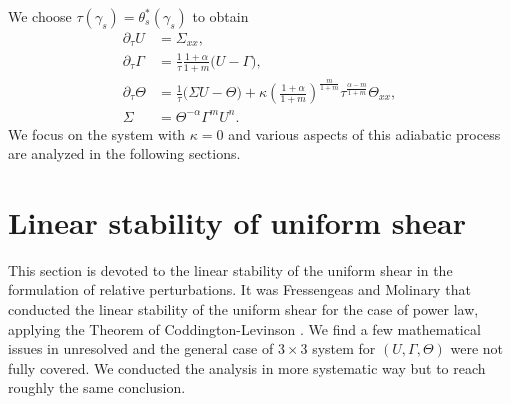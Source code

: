 \documentclass[a4paper,11pt]{article}
\theoremstyle{remark}
\begin{document}
We choose $\tau(\gamma_s) = \theta_s^*(\gamma_s)$ to obtain
\begin{equation}
 \begin{aligned}
  \partial_\tau U &= \Sigma_{xx},\\
  \partial_\tau \Gamma &= \frac{1}{\tau}\frac{1+\alpha}{1+m} \Big(U-\Gamma\Big),\\
  \partial_\tau \Theta &= \frac{1}{\tau}\Big(\Sigma U - \Theta\Big) + \kappa\left(\frac{1+\alpha}{1+m}\right)^{\frac{m}{1+m}}\tau^{\frac{\alpha-m}{1+m}}\Theta_{xx}, \\
  \Sigma&=\Theta^{-\alpha}\Gamma^m U^n.
 \end{aligned}
\end{equation}
We focus on the system with $\kappa=0$ and various aspects of this adiabatic process are  analyzed in the following sections. %


\section{Linear stability of uniform shear}

This section is devoted to the linear stability of the uniform shear in the formulation of relative perturbations. It was Fressengeas and Molinary \cite{FM} that conducted the linear stability of the uniform shear for the case of power law, applying the Theorem of Coddington-Levinson \cite{CL1955}. We find a few mathematical issues in \cite{FM} unresolved and the general case of $3\times3$ system for $(U,\Gamma,\Theta)$ were not fully covered. We conducted the analysis in more systematic way but to reach roughly the same conclusion.
\end{document}
